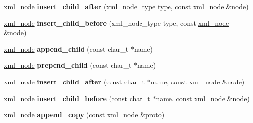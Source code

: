 \begin{DoxyCompactItemize}
\item 
\hypertarget{classpugi_1_1xml__node_a4dd8d25c02560a2692c43cc4779fb7e3}{\hyperlink{classpugi_1_1xml__node}{xml\+\_\+node} {\bfseries insert\+\_\+child\+\_\+after} (xml\+\_\+node\+\_\+type type, const \hyperlink{classpugi_1_1xml__node}{xml\+\_\+node} \&node)}\label{classpugi_1_1xml__node_a4dd8d25c02560a2692c43cc4779fb7e3}

\item 
\hypertarget{classpugi_1_1xml__node_afe89f53c01eac8209b06f9fe7f84e7c1}{\hyperlink{classpugi_1_1xml__node}{xml\+\_\+node} {\bfseries insert\+\_\+child\+\_\+before} (xml\+\_\+node\+\_\+type type, const \hyperlink{classpugi_1_1xml__node}{xml\+\_\+node} \&node)}\label{classpugi_1_1xml__node_afe89f53c01eac8209b06f9fe7f84e7c1}

\item 
\hypertarget{classpugi_1_1xml__node_a448342425806a4ad8068bf98fd4ff462}{\hyperlink{classpugi_1_1xml__node}{xml\+\_\+node} {\bfseries append\+\_\+child} (const char\+\_\+t $\ast$name)}\label{classpugi_1_1xml__node_a448342425806a4ad8068bf98fd4ff462}

\item 
\hypertarget{classpugi_1_1xml__node_afa78286431f99a0f35b18185e11e28e8}{\hyperlink{classpugi_1_1xml__node}{xml\+\_\+node} {\bfseries prepend\+\_\+child} (const char\+\_\+t $\ast$name)}\label{classpugi_1_1xml__node_afa78286431f99a0f35b18185e11e28e8}

\item 
\hypertarget{classpugi_1_1xml__node_a778c2246fef9964b2d947253a86f2982}{\hyperlink{classpugi_1_1xml__node}{xml\+\_\+node} {\bfseries insert\+\_\+child\+\_\+after} (const char\+\_\+t $\ast$name, const \hyperlink{classpugi_1_1xml__node}{xml\+\_\+node} \&node)}\label{classpugi_1_1xml__node_a778c2246fef9964b2d947253a86f2982}

\item 
\hypertarget{classpugi_1_1xml__node_a70fa68762aed11c82a1b913571df4394}{\hyperlink{classpugi_1_1xml__node}{xml\+\_\+node} {\bfseries insert\+\_\+child\+\_\+before} (const char\+\_\+t $\ast$name, const \hyperlink{classpugi_1_1xml__node}{xml\+\_\+node} \&node)}\label{classpugi_1_1xml__node_a70fa68762aed11c82a1b913571df4394}

\item 
\hypertarget{classpugi_1_1xml__node_a17971e2b69c4dd4f45c461ebffe96732}{\hyperlink{classpugi_1_1xml__node}{xml\+\_\+node} {\bfseries append\+\_\+copy} (const \hyperlink{classpugi_1_1xml__node}{xml\+\_\+node} \&proto)}\label{classpugi_1_1xml__node_a17971e2b69c4dd4f45c461ebffe96732}


\end{DoxyCompactItemize}

